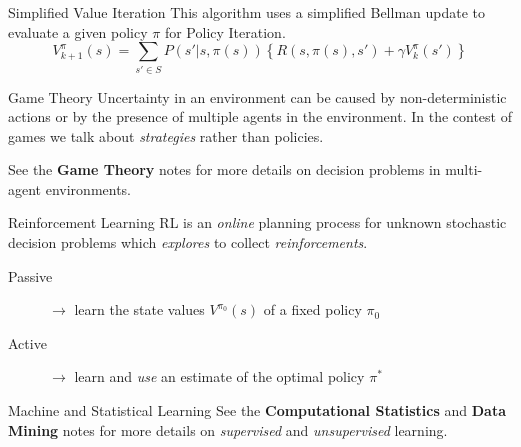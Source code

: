 \documentclass{cognito}
\begin{document}
\begin{note}{Simplified Value Iteration}
	This algorithm uses a simplified Bellman update to evaluate a given policy $\pi$ for Policy Iteration.
	$$
		V^{\pi}_{k+1}(s) =  \sum_{s' \in S} P(s' | s, \pi(s)) \left\{ R(s,\pi(s),s') + \gamma V^{\pi}_k(s') \right\}
	$$
	\vspace{-10pt}
\end{note}




\begin{note}{Game Theory}
	Uncertainty in an environment can be caused by non-deterministic actions or by
	the presence of multiple agents in the environment.
	In the contest of games we talk about \emph{strategies} rather than policies.
	\vspace{5pt}

	See the \textbf{Game Theory} \noteref notes for more details on decision problems in multi-agent environments.
\end{note}

\begin{note}{Reinforcement Learning}
	RL is an \emph{online} planning process for unknown stochastic decision problems which \emph{explores} to collect \emph{reinforcements}.
	\begin{description}
		\item[Passive] $\to$ learn the state values $V^{\pi_0}(s)$ of a fixed policy $\pi_0$
		\item[Active] $\to$ learn and \emph{use} an estimate of the optimal policy $\pi^*$
	\end{description}
	\vspace{-5pt}
\end{note}

\begin{note}{Machine and Statistical Learning}
	See the \textbf{Computational Statistics} \noteref and \textbf{Data Mining} \noteref notes
	for more details on \emph{supervised} and \emph{unsupervised} learning.
	
\end{note}

\end{document}

